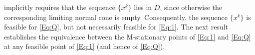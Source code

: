 \documentclass[11pt,a4paper,reqno]{amsart}
\begin{document}
{ implicitly requires that the sequence $\{x^k\}$ lies in $D$, since otherwise the corresponding limiting normal cone is empty. Consequently, the sequence $\{x^k\}$ is feasible for \eqref{Eq:Q}, but not necessarily feasible for \eqref{Eq:1}. The next result establishes the equivalence between the M-stationary points of \eqref{Eq:1} and \eqref{Eq:Q} at any 
feasible point of \eqref{Eq:1} (and hence of \eqref{Eq:Q}).


}
\end{document}
